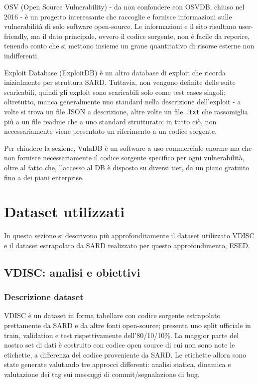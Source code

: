 \documentclass[conference]{IEEEtran}
\begin{document}
OSV (Open Source Vulnerability) - da non confondere con OSVDB, chiuso nel 2016 - è un progetto interessante che raccoglie e fornisce informazioni sulle vulnerabilità di solo software open-source. Le informazioni e il sito risultano user-friendly, ma il dato principale, ovvero il codice sorgente, non è facile da reperire, tenendo conto che si mettono insieme un grane quantitativo di risorse esterne non indifferenti.

Exploit Database (ExploitDB) è un altro database di exploit che ricorda inizialmente per struttura SARD. Tuttavia, non vengono definite delle suite scaricabili, quindi gli exploit sono scaricabili solo come test cases singoli; oltretutto, manca generalmente uno standard nella descrizione dell'exploit - a volte si trova un file JSON a descrizione, altre volte un file \texttt{.txt} che rassomiglia più a un file readme che a uno standard strutturato; in tutto ciò, non necessariamente viene presentato un riferimento a un codice sorgente.

Per chiudere la sezione, VulnDB è un software a uso commerciale enorme ma che non fornisce necessariamente il codice sorgente specifico per ogni vulnerabilità, oltre al fatto che, l'accesso al DB è disposto su diversi tier, da un piano gratuito fino a dei piani enterprise.

\section{Dataset utilizzati}
In questa sezione si descrivono più approfonditamente il dataset utilizzato VDISC e il dataset estrapolato da SARD realizzato per questo approfondimento, ESED.

\subsection{VDISC: analisi e obiettivi}

\subsubsection{Descrizione dataset}
VDISC è un dataset in forma tabellare con codice sorgente estrapolato prettamente da SARD e da altre fonti open-source; presenta uno split ufficiale in train, validation e test rispettivamente dell'80/10/10\%. 
La maggior parte del nostro set di dati è costruito con codice open source di cui non sono note le etichette, a differenza del codice proveniente da SARD. Le etichette allora sono state generate valutando tre approcci differenti: analisi statica, dinamica e valutazione dei tag sui messaggi di commit/segnalazione di bug.
\end{document}
